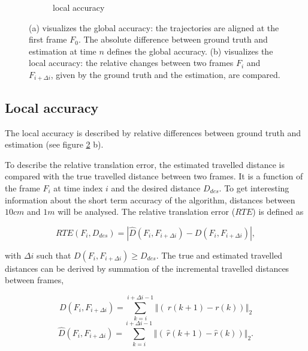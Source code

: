 \begin{figure}
\begin{subfigure}[b]{0.28\textwidth}
    \caption{local accuracy}
    \label{fig:4}
  \end{subfigure}
  \hspace*{1cm}
\caption{(a) visualizes the global accuracy: the trajectories are aligned at the first frame $F_{0}$. The absolute difference between ground truth and estimation at time $n$ defines the global accuracy. (b) visualizes the local accuracy: the relative changes between two frames $F_i$ and $F_{i+\Delta i}$, given by the ground truth and the estimation, are compared.}
\label{pics:absolute_relative}
\end{figure}





\subsection{Local accuracy}
\label{sec:local}

The local accuracy is described by relative differences between ground truth and estimation (see figure \ref{pics:absolute_relative} b). 

To describe the relative translation error, the estimated travelled distance is compared with the true travelled distance between two frames. It is a function of the frame $F_i$ at time index $i$ and the desired distance $D_{des}$. To get interesting information about the short term accuracy of the algorithm, distances between $10cm$ and $1m$ will be analysed. The relative translation error ($RTE$) is defined as

\begin{equation}
RTE \left( F_i, D_{des} \right) = \left| \hat{D} \left( F_i, F_{i+\Delta i} \right) - D \left( F_i, F_{i+\Delta i} \right)\right| ,
\end{equation}

with $ \Delta i $ such that $ D \left( F_i, F_{i+\Delta i} \right) \geq D_{des} $. The true and estimated travelled distances can be derived by summation of the incremental travelled distances between frames,

\begin{equation}
       D \left( F_i, F_{i+\Delta i} \right) = \sum_{k=i}^{i+\Delta i-1} \left\Vert\left(\ r \left( k+1 \right) - r \left( k \right) \right) \right\Vert_2
\end{equation}
\begin{equation}
       \hat{D} \left( F_i, F_{i+\Delta i} \right) = \sum_{k=i}^{i+\Delta i-1} \left\Vert\left(\ \hat{r} \left( k+1 \right) - \hat{r} \left( k \right) \right) \right\Vert_2 .
\end{equation}

